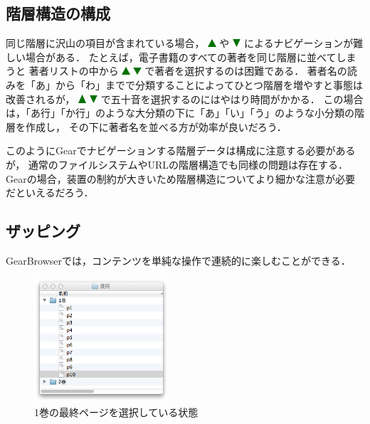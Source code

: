 \documentclass[twoside]{wiss}
\def\GEAR{\textsf{Gear}}
\def\GB{\textsf{GearBrowser}}
\def\figwidth{50mm}
\def\up{ \includegraphics[width=3mm,bb=0 0 36 36]{figures/uptriangle.pdf} }
\def\down{ \includegraphics[width=3mm,bb=0 0 36 36]{figures/downtriangle.pdf} }
\begin{document}
\subsection{階層構造の構成}

同じ階層に沢山の項目が含まれている場合，
{\up}や{\down}によるナビゲーションが難しい場合がある．
たとえば，電子書籍のすべての著者を同じ階層に並べてしまうと
著者リストの中から{\up}{\down}で著者を選択するのは困難である．
著者名の読みを「あ」から「わ」までで分類することによってひとつ階層を増やすと事態は改善されるが，
{\up}{\down}で五十音を選択するのにはやはり時間がかかる．
この場合は，「あ行」「か行」のような大分類の下に「あ」「い」「う」のような小分類の階層を作成し，
その下に著者名を並べる方が効率が良いだろう．

このように{\GEAR}でナビゲーションする階層データは構成に注意する必要があるが，
通常のファイルシステムやURLの階層構造でも同様の問題は存在する．
{\GEAR}の場合，装置の制約が大きいため階層構造についてより細かな注意が必要だといえるだろう．

\subsection{ザッピング}


{\GB}では，コンテンツを単純な操作で連続的に楽しむことができる．

\begin{figure}[H]
\centerline{\includegraphics[width=\figwidth,bb=0 0 344 318]{figures/9a8615b0242c9ba4deb77ca30ab94d7c.png}}
\caption{1巻の最終ページを選択している状態}
\label{manga1}
\end{figure}
\end{document}
